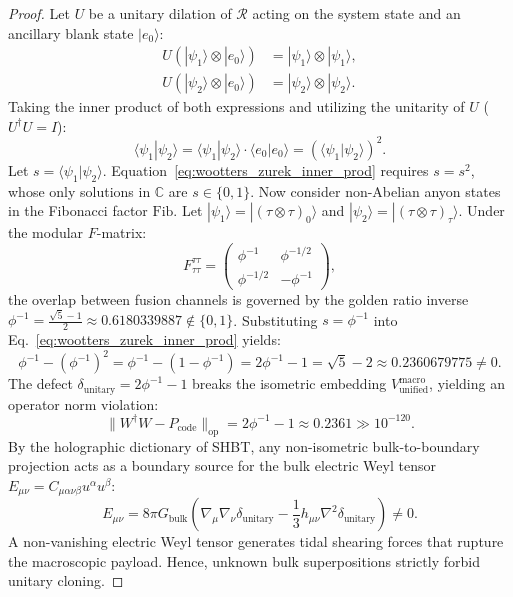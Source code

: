 \documentclass[11pt,onecolumn]{article}
\begin{document}
\begin{proof}
Let $U$ be a unitary dilation of $\mathcal{R}$ acting on the system state and an ancillary blank state $|e_0\rangle$:
\begin{align}
U (|\psi_1\rangle \otimes |e_0\rangle) &= |\psi_1\rangle \otimes |\psi_1\rangle, \\
U (|\psi_2\rangle \otimes |e_0\rangle) &= |\psi_2\rangle \otimes |\psi_2\rangle.
\end{align}
Taking the inner product of both expressions and utilizing the unitarity of $U$ ($U^\dagger U = I$):
\begin{equation}
\langle\psi_1|\psi_2\rangle = \langle\psi_1|\psi_2\rangle \cdot \langle e_0|e_0\rangle = \left(\langle\psi_1|\psi_2\rangle\right)^2.
\label{eq:wootters_zurek_inner_prod}
\end{equation}
Let $s = \langle\psi_1|\psi_2\rangle$. Equation~\eqref{eq:wootters_zurek_inner_prod} requires $s = s^2$, whose only solutions in $\mathbb{C}$ are $s \in \{0, 1\}$. Now consider non-Abelian anyon states in the Fibonacci factor $\text{Fib}$. Let $|\psi_1\rangle = |(\tau \otimes \tau)_0\rangle$ and $|\psi_2\rangle = |(\tau \otimes \tau)_\tau\rangle$. Under the modular $F$-matrix:
\begin{equation}
F_{\tau\tau}^{\tau\tau} = \begin{pmatrix} \phi^{-1} & \phi^{-1/2} \\ \phi^{-1/2} & -\phi^{-1} \end{pmatrix},
\label{eq:fibonacci_f_matrix}
\end{equation}
the overlap between fusion channels is governed by the golden ratio inverse $\phi^{-1} = \frac{\sqrt{5}-1}{2} \approx 0.6180339887 \notin \{0, 1\}$. Substituting $s = \phi^{-1}$ into Eq.~\eqref{eq:wootters_zurek_inner_prod} yields:
\begin{equation}
\phi^{-1} - \left(\phi^{-1}\right)^2 = \phi^{-1} - (1 - \phi^{-1}) = 2\phi^{-1} - 1 = \sqrt{5} - 2 \approx 0.2360679775 \neq 0.
\end{equation}
The defect $\delta_{\text{unitary}} = 2\phi^{-1} - 1$ breaks the isometric embedding $V_{\text{unified}}^{\text{macro}}$, yielding an operator norm violation:
\begin{equation}
\|W^\dagger W - P_{\text{code}}\|_{\text{op}} = 2\phi^{-1} - 1 \approx 0.2361 \gg 10^{-120}.
\end{equation}
By the holographic dictionary of SHBT, any non-isometric bulk-to-boundary projection acts as a boundary source for the bulk electric Weyl tensor $E_{\mu\nu} = C_{\mu\alpha\nu\beta} u^\alpha u^\beta$:
\begin{equation}
E_{\mu\nu} = 8\pi G_{\text{bulk}} \left( \nabla_\mu \nabla_\nu \delta_{\text{unitary}} - \frac{1}{3} h_{\mu\nu} \nabla^2 \delta_{\text{unitary}} \right) \neq 0.
\end{equation}
A non-vanishing electric Weyl tensor generates tidal shearing forces that rupture the macroscopic payload. Hence, unknown bulk superpositions strictly forbid unitary cloning.
\end{proof}
\end{document}
